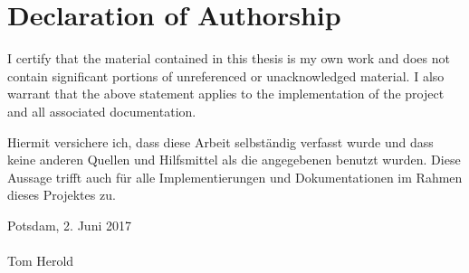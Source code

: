 \section*{Declaration of Authorship}

I certify that the material contained in this thesis is my own work and does
not contain significant portions of unreferenced or unacknowledged material. I also warrant that the above statement applies to the implementation
of the project and all associated documentation.

Hiermit versichere ich, dass diese Arbeit selbst\"andig verfasst wurde und
dass keine anderen Quellen und Hilfsmittel als die angegebenen benutzt
wurden. Diese Aussage trifft auch f\"ur alle Implementierungen und Dokumentationen im Rahmen dieses Projektes zu.

Potsdam, 2. Juni 2017\\[10ex]




\makebox[2.5in]{\hrulefill}\\
Tom Herold
